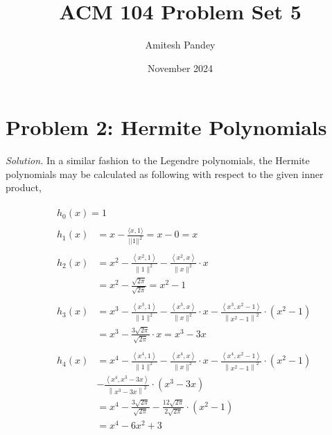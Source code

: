 \documentclass{article}
\title{ACM 104 Problem Set 5}
\author{Amitesh Pandey}
\date{November 2024}
\begin{document}
\maketitle
\section*{Problem 2: Hermite Polynomials}
\emph{Solution. }In a similar fashion to the Legendre polynomials, the Hermite polynomials may be calculated as following with respect to the given inner product,

\begin{equation*}
\begin{aligned}
&\begin{aligned}
    h_{0}(x) = 1
\end{aligned}\\
&\begin{aligned}
    h_{1}(x) &= x - \frac{\langle x, 1\rangle}{||1||^2} = x - 0 = x
\end{aligned}\\
&\begin{aligned}
h_2(x) & =x^2-\frac{\left\langle x^2, 1\right\rangle}{\|1\|^2}-\frac{\left\langle x^2, x\right\rangle}{\|x\|^2} \cdot x \\
& =x^2-\frac{\sqrt{2 \pi}}{\sqrt{2 \pi}} =x^2-1
\end{aligned}\\
&\begin{aligned}
h_3(x) & =x^3-\frac{\left\langle x^3, 1\right\rangle}{\|1\|^2}-\frac{\left\langle x^3, x\right\rangle}{\|x\|^2} \cdot x-\frac{\left\langle x^3, x^2-1\right\rangle}{\left\|x^2-1\right\|^2} \cdot\left(x^2-1\right) \\
& =x^3-\frac{3 \sqrt{2 \pi}}{\sqrt{2 \pi}} \cdot x =x^3-3 x
\end{aligned}\\
&\begin{aligned}
h_4(x) & =x^4-\frac{\left\langle x^4, 1\right\rangle}{\|1\|^2}-\frac{\left\langle x^4, x\right\rangle}{\|x\|^2} \cdot x-\frac{\left\langle x^4, x^2-1\right\rangle}{\left\|x^2-1\right\|^2} \cdot\left(x^2-1\right)\\
&-\frac{\left\langle x^4, x^3-3 x\right\rangle}{\left\|x^3-3 x\right\|^2} \cdot\left(x^3-3 x\right) \\
& =x^4-\frac{3 \sqrt{2 \pi}}{\sqrt{2 \pi}}-\frac{12 \sqrt{2 \pi}}{2 \sqrt{2 \pi}} \cdot\left(x^2-1\right) \\
& =x^4-6 x^2+3
\end{aligned}
\end{aligned}
\end{equation*}
\newpage
\end{document}
